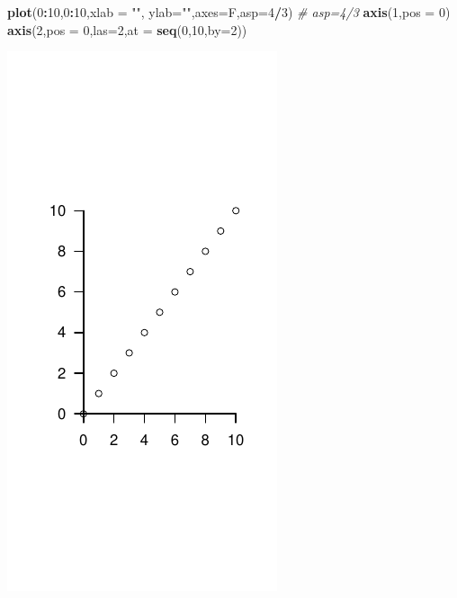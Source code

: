 \documentclass[
  11pt,
]{book}
\newenvironment{Shaded}{\begin{snugshade}}{\end{snugshade}}
\newcommand{\AttributeTok}[1]{\textcolor[rgb]{0.13,0.29,0.53}{#1}}
\newcommand{\CommentTok}[1]{\textcolor[rgb]{0.56,0.35,0.01}{\textit{#1}}}
\newcommand{\DecValTok}[1]{\textcolor[rgb]{0.00,0.00,0.81}{#1}}
\newcommand{\FunctionTok}[1]{\textcolor[rgb]{0.13,0.29,0.53}{\textbf{#1}}}
\newcommand{\NormalTok}[1]{#1}
\newcommand{\SpecialCharTok}[1]{\textcolor[rgb]{0.81,0.36,0.00}{\textbf{#1}}}
\newcommand{\StringTok}[1]{\textcolor[rgb]{0.31,0.60,0.02}{#1}}
\theoremstyle{mytheoremstyle}
\theoremstyle{mydefstyle}
\begin{document}
\begin{Shaded}
\begin{Highlighting}[]
\FunctionTok{plot}\NormalTok{(}\DecValTok{0}\SpecialCharTok{:}\DecValTok{10}\NormalTok{,}\DecValTok{0}\SpecialCharTok{:}\DecValTok{10}\NormalTok{,}\AttributeTok{xlab =} \StringTok{""}\NormalTok{, }\AttributeTok{ylab=}\StringTok{""}\NormalTok{,}\AttributeTok{axes=}\NormalTok{F,}\AttributeTok{asp=}\DecValTok{4}\SpecialCharTok{/}\DecValTok{3}\NormalTok{) }\CommentTok{\# asp=4/3 }
\FunctionTok{axis}\NormalTok{(}\DecValTok{1}\NormalTok{,}\AttributeTok{pos =} \DecValTok{0}\NormalTok{)}
\FunctionTok{axis}\NormalTok{(}\DecValTok{2}\NormalTok{,}\AttributeTok{pos =} \DecValTok{0}\NormalTok{,}\AttributeTok{las=}\DecValTok{2}\NormalTok{,}\AttributeTok{at =} \FunctionTok{seq}\NormalTok{(}\DecValTok{0}\NormalTok{,}\DecValTok{10}\NormalTok{,}\AttributeTok{by=}\DecValTok{2}\NormalTok{))}
\end{Highlighting}
\end{Shaded}

\begin{center}\includegraphics{Appunti_di_Statistica_2025_files/figure-latex/24-Libro-33,-1} \end{center}
\end{document}
